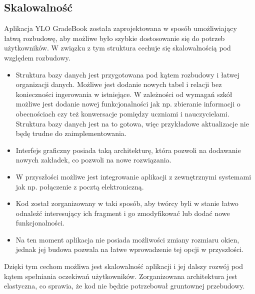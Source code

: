 \subsection{Skalowalność}
\label{Skalowalność}
Aplikacja YLO GradeBook została zaprojektowana w sposób umożliwiający łatwą rozbudowę, aby możliwe było szybkie dostosowanie się do potrzeb użytkowników. W związku z tym struktura cechuje się skalowalnością pod względem rozbudowy.
\begin{itemize}
      \item Struktura bazy danych jest przygotowana pod kątem rozbudowy i łatwej organizacji danych. Możliwe jest dodanie nowych tabel i relacji bez konieczności ingerowania w istniejące. W zależności od wymagań szkół możliwe jest dodanie nowej funkcjonalności jak np. zbieranie informacji o obecnościach czy też konwersacje pomiędzy uczniami i nauczycielami. Struktura bazy danych jest na to gotowa, więc przykładowe aktualizacje nie będę trudne do zaimplementowania.
      \item Interfejs graficzny posiada taką architekturę, która pozwoli na dodawanie nowych zakładek, co pozwoli na nowe rozwiązania.
      \item W przyszłości możliwe jest integrowanie aplikacji z zewnętrznymi systemami jak np. połączenie z pocztą elektroniczną.
      \item Kod został zorganizowany w taki sposób, aby twórcy byli w stanie łatwo odnaleźć interesujący ich fragment i go zmodyfikować lub dodać nowe funkcjonalności.
      \item Na ten moment aplikacja nie posiada możliwości zmiany rozmiaru okien, jednak jej budowa pozwala na łatwe wprowadzenie tej opcji w przyszłości.
\end{itemize}
Dzięki tym cechom możliwa jest skalowalność aplikacji i jej dalszy rozwój pod kątem spełniania oczekiwań użytkowników. Zorganizowana architektura jest elastyczna, co sprawia, że kod nie będzie potrzebował gruntownej przebudowy.
\newpage
